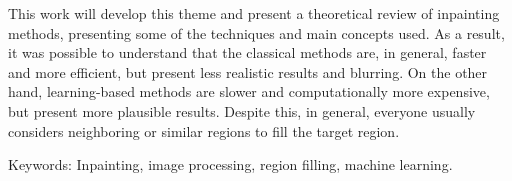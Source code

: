 This work will develop this theme and present a theoretical review of inpainting methods, presenting some of the techniques and main concepts used. As a result, it was possible to understand that the classical methods are, in general, faster and more efficient, but present less realistic results and blurring. On the other hand, learning-based methods are slower and computationally more expensive, but present more plausible results. Despite this, in general, everyone usually considers neighboring or similar regions to fill the target region.

Keywords: Inpainting, image processing, region filling, machine learning.